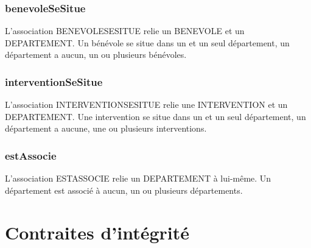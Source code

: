 \documentclass[asi, sansVersion]{picInsa}
\begin{document}
\subsection*{benevoleSeSitue}

L'association BENEVOLESESITUE relie un BENEVOLE et un DEPARTEMENT. Un bénévole se situe dans un et un seul département, un département a aucun, un ou plusieurs bénévoles.

\subsection*{interventionSeSitue}

L'association INTERVENTIONSESITUE relie une INTERVENTION et un DEPARTEMENT. Une intervention se situe dans un et un seul département, un département a aucune, une ou plusieurs interventions.

\subsection*{estAssocie}

L'association ESTASSOCIE relie un DEPARTEMENT à lui-même. Un département est associé à aucun, un ou plusieurs départements.

\chapter{Contraites d'intégrité}
\end{document}
